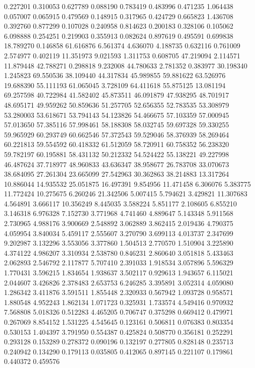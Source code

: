 0.227201
0.310053
0.627789
0.088190
0.783419
0.483996
0.471235
1.064438
0.057007
0.065915
0.479569
0.148915
0.317965
0.424729
0.665823
1.436708
0.392760
0.877299
0.107028
0.240958
0.814623
0.200183
0.328106
0.105062
6.098888
0.254251
0.219903
0.355913
0.082624
0.897619
0.495591
0.699838
18.789270
0.146858
61.616876
6.561374
4.636070
4.188735
0.632116
0.761009
2.574977
0.402119
11.351973
9.021593
1.311753
0.608705
47.219094
2.114571
11.879448
42.788271
0.298818
9.232008
44.780633
2.781352
0.383977
30.198340
1.245823
69.550536
38.109440
44.317834
45.989855
59.881622
63.526976
19.688390
55.111193
61.065045
3.728109
64.411618
55.875125
13.081194
69.257598
40.722984
41.582402
45.873511
46.091879
47.938295
48.701917
48.695171
49.959262
50.859636
51.257705
52.656355
52.783535
53.308979
53.280003
53.618671
53.794143
54.123826
54.466675
57.103359
57.000945
57.013650
57.385116
57.998461
58.188308
58.032745
59.697328
59.330255
59.965929
60.293749
60.662546
57.372543
59.529046
58.376939
58.269464
60.221813
59.554592
60.418332
61.512059
58.720911
60.758352
56.238320
59.782197
60.195881
58.431132
50.212332
54.524422
55.138221
49.227998
46.487624
37.718977
48.960833
43.636347
38.958677
26.783708
33.070673
38.684095
27.261304
23.665099
27.542963
30.362863
38.214883
13.317264
10.886044
14.935532
25.051875
16.497391
9.854956
11.471458
6.306076
5.383775
11.772424
10.275675
6.260246
21.342506
5.007415
5.794621
3.429821
11.307683
4.564891
3.666117
10.356249
8.445035
3.588224
5.851177
2.108605
6.855210
3.146318
6.976328
7.152730
3.771968
4.741460
4.889647
5.143348
5.911568
2.730965
4.988176
3.900669
2.548892
3.062889
3.862415
2.019436
4.790375
4.059954
3.840034
5.459117
2.555607
3.270790
3.699113
4.013737
2.347699
9.202987
3.132296
3.553056
3.377860
1.504513
2.770570
1.510904
3.225890
4.374122
4.986207
3.310934
2.538780
0.846231
2.860640
3.051818
5.433463
2.062893
2.546792
2.117877
5.707410
2.391033
1.918534
3.057896
5.596329
1.770431
3.596215
1.834654
1.938637
3.502117
0.929613
1.943657
6.115021
2.044607
3.426826
2.378483
2.653753
6.246285
3.395891
3.052314
4.059080
1.286342
3.411876
3.591511
1.855448
2.320933
0.567942
1.093728
0.958571
1.880548
4.952243
1.862134
1.071723
0.325931
1.733574
4.549416
0.970932
7.568808
5.018326
0.512283
4.465205
0.706747
0.375298
0.669412
0.479971
0.267069
8.854152
1.531225
4.545645
0.123161
0.506811
0.076383
0.803354
0.530153
1.404397
3.791950
0.554387
0.425824
0.508770
0.356181
0.252291
0.293128
0.153289
0.278372
0.090196
0.132197
0.277805
0.828148
0.235713
0.240942
0.134290
0.179113
0.035805
0.412065
0.897145
0.221107
0.179861
0.440372
0.459576
